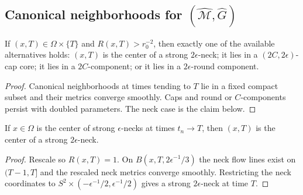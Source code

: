 \subsection{Canonical neighborhoods for $(\widehat{\mathcal M},\widehat G)$}
\begin{lemma}
\label{lem:canonical-neighborhoods-at-time-T}\label{omegacanon}
If $(x,T)\in\Omega\times\{T\}$ and $R(x,T)>r_0^{-2}$, then exactly one of
the available alternatives holds: $(x,T)$ is the center of a strong
$2\epsilon$-neck; it lies in a $(2C,2\epsilon)$-cap core; it lies in a
$2C$-component; or it lies in a $2\epsilon$-round component.
\end{lemma}
\begin{proof}
\sketch Canonical neighborhoods at times tending to $T$ lie in a fixed
compact subset and their metrics converge smoothly. Caps and round or
$C$-components persist with doubled parameters. The neck case is the claim
below.\end{proof}

\begin{claim}
\label{claim:limit-of-necks-is-neck}\label{epslimit}
If $x\in\Omega$ is the center of strong $\epsilon$-necks at times
$t_n\to T$, then $(x,T)$ is the center of a strong $2\epsilon$-neck.
\end{claim}
\begin{proof}\sketch Rescale so $R(x,T)=1$. On
$B(x,T,2\epsilon^{-1}/3)$ the neck flow lines exist on $(T-1,T]$ and the
rescaled neck metrics converge smoothly. Restricting the neck coordinates to
$S^2\times(-\epsilon^{-1}/2,\epsilon^{-1}/2)$ gives a strong
$2\epsilon$-neck at time $T$.\end{proof}

